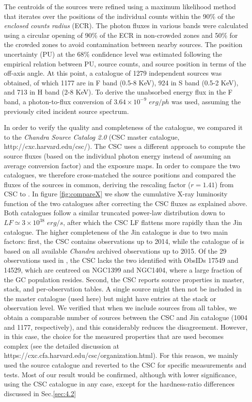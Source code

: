 \documentclass{aa}
\begin{document}
The centroids of the sources were refined using a maximum likelihood method that iterates over the positions of the individual counts within the 90\% of the \textit{enclosed counts radius} (ECR). The photon fluxes in various bands were calculated using a circular opening of 90\% of the ECR in non-crowded zones and 50\% for the crowded zones to avoid contamination between nearby sources. The position uncertainty (PU) at the 68\% confidence level was estimated following the empirical relation between PU, source counts, and source
position in terms of the off-axis angle.
At this point, a catalogue of 1279 independent sources was obtained, of which 1177 are in F band (0.5-8 KeV), 924 in S band (0.5-2 KeV), and 713 in H band (2-8 KeV). To derive the unabsorbed energy flux in the F band, a photon-to-flux conversion of $3.64\times 10^{-9}$ $erg/ph$ was used, assuming the previously cited incident source spectrum.

In order to verify the quality and completeness of the catalogue, we compared it to the \textit{Chandra Source Catalog 2.0} (CSC master catalogue, http://cxc.harvard.edu/csc/). The CSC uses a different approach to compute the source fluxes (based on the individual photon energy instead of assuming an average conversion factor) and the exposure maps. In order to compare the two catalogues, we therefore cross-matched the source positions and compared the fluxes of the sources in common, deriving the rescaling factor ($r=1.41$) from CSC to \cite{Jin2019}. 
In figure \ref{fig:compareX} we show the cumulative X-ray luminosity function of the two catalogues after correcting the CSC fluxes as explained above. Both catalogues follow a similar truncated power-law distribution down to $LF\simeq 3\times10^{38}$ $erg/s$, after which 
the CSC LF flattens more rapidly than the Jin catalogue. The higher completeness of the Jin catalogue is due to two main factors: first, the CSC contains observations up to 2014, while the catalogue of \cite{Jin2019}  is based on all available \textit{Chandra} archived observations up to 2015. Of the 29 observations used in \cite{Jin2019}, the CSC lacks the two identified with ObsIDs 17549 and 14529, which are centreed on NGC1399 and NGC1404, where a large fraction of the GC population resides. Second, the CSC reports source properties in master, stack, and per-observation tables. A single source might then not be included in the master catalogue (used here) but might have entries at the stack or observation level. We verified that when we include sources from all tables, we obtain a comparable number of sources between the CSC and Jin catalogue (1004 and 1177, respectively), and this considerably reduces the disagreement. However, in this case, the choice for the measured properties that are used becomes complex (see the detailed discussion at https://cxc.cfa.harvard.edu/csc/organization.html).
For this reason, we mainly used the \cite{Jin2019} source catalogue and reverted to the CSC for specific measurements and tests. Most of our result would be confirmed, although with lower significance, using the CSC catalogue in any case, except for the hardness-ratio differences discussed in Sec.\ref{sec:4.2}
\end{document}
